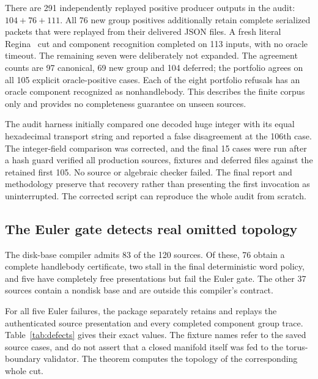 There are 291 independently replayed positive producer outputs in the audit:
$104+76+111$. All 76 new group positives additionally retain complete serialized
packets that were replayed from their delivered JSON files. A fresh literal
Regina~\cite{Regina} cut and component recognition completed on 113 inputs, with no oracle
timeout. The remaining seven were deliberately not expanded. The agreement
counts are 97 canonical, 69 new group and 104 deferred; the portfolio agrees on
all 105 explicit oracle-positive cases. Each of the eight portfolio refusals
has an oracle component recognized as nonhandlebody. This describes the finite
corpus only and provides no completeness guarantee on unseen sources.

The audit harness initially compared one decoded huge integer with its equal
hexadecimal transport string and reported a false disagreement at the 106th
case. The integer-field comparison was corrected, and the final 15 cases were
run after a hash guard verified all production sources, fixtures and deferred
files against the retained first 105. No source or algebraic checker failed.
The final report and methodology preserve that recovery rather than presenting
the first invocation as uninterrupted. The corrected script can reproduce the
whole audit from scratch.

\subsection{The Euler gate detects real omitted topology}

The disk-base compiler admits 83 of the 120 sources. Of these, 76 obtain a
complete handlebody certificate, two stall in the final deterministic word
policy, and five have completely free presentations but fail the Euler gate.
The other 37 sources contain a nondisk base and are outside this compiler's
contract.

For all five Euler failures, the package separately retains and replays the
authenticated source presentation and every completed component group trace.
Table~\ref{tab:defects} gives their exact values. The fixture names refer to
the saved source cases, and do not assert that a closed manifold itself was
fed to the torus-boundary validator. The theorem computes the topology of the
corresponding whole cut.

